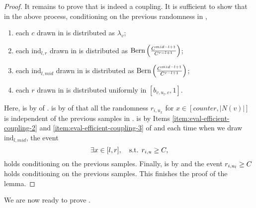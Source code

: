 \begin{proof}
      It remains to prove that  is indeed a coupling. It is sufficient to show that in the above process, conditioning on the previous randomness in ,
      \begin{enumerate}[label=(\alph*)]
          \item each $c$ drawn in  is distributed as $\lambda_v$; \label{item:coupling-1}
          \item each $\textrm{ind}_{l,r}$ drawn in  is  distributed as $\textrm{Bern}\left(\frac{C^{mid-l+1}} {C^{r-l+1}}\right)$;  \label{item:coupling-2}
          \item each $\textrm{ind}_{l,mid}$ drawn in  is  distributed as $\textrm{Bern}\left(\frac{C^{mid-l+1}} {C^{r-l+1}}\right)$; \label{item:coupling-3}
          \item each $r$ drawn in  is distributed uniformly in $[b_{v,u_l,c},1]$.\label{item:coupling-4}
      \end{enumerate} 
      Here,  is by  of .  is by  of  that all the randomness $r_{i,u_x}$ for $x\in [counter,|N(v)|]$ is independent of the previous samples in .  is by Items \ref{item:eval-efficient-coupling-2} and \ref{item:eval-efficient-coupling-3} of  and each time when we draw $\textrm{ind}_{l,mid}$, the event 
      \[
      \exists x\in [l,r],\quad \text{s.t. } r_{i,u}\geq C,
      \]
      holds conditioning on the previous samples. Finally,  is by  and the event $r_{i,u_l}\geq C$ holds conditioning on the previous samples. This finishes the proof of the lemma.
\end{proof}


We are now ready to prove .

